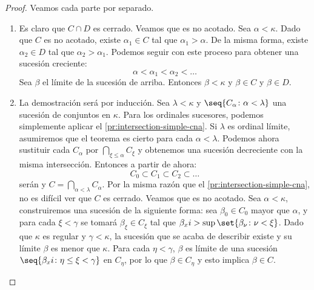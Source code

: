 \begin{proof}
    Veamos cada parte por separado.

    \begin{enumerate}[label=\alph*)]
        \item\label{pr:intersection-simple-cna}
            Es claro que $C\cap D$ es cerrado. Veamos que es no acotado.
            Sea $\alpha<\kappa$. Dado que $C$ es no acotado, existe $\alpha_1\in C$
            tal que $\alpha_1 > \alpha$. De la misma forma, existe $\alpha_2\in D$
            tal que $\alpha_2 > \alpha_1$. Podemos seguir con este proceso para obtener
            una sucesión creciente:
            \[
                \alpha < \alpha_1 < \alpha_2 < \dots
            \]
            Sea $\beta$ el límite de la sucesión de arriba.
            Entonces $\beta < \kappa$ y $\beta\in C$ y $\beta\in D$.


        \item\label{pr:intersection-cna}
            La demostración será por inducción.
            Sea $\lambda<\kappa$ y $\seq{C_\alpha\colon\alpha<\lambda}$
            una sucesión de conjuntos \cna{} en $\kappa$.
            Para los ordinales sucesores, podemos simplemente aplicar
            el \cref{pr:intersection-simple-cna}.
            Si $\lambda$ es ordinal límite, asumiremos que el teorema
            es cierto para cada $\alpha<\lambda$. Podemos ahora sustituir
            cada $C_\alpha$ por $\bigcap_{\xi\leq\alpha} C_\xi$ y obtenemos
            una sucesión decreciente con la misma intersección. Entonces a partir de ahora:
            \[
                C_0 \subset C_1 \subset C_2 \subset \dots
            \]
            serán \cna{} y $C = \bigcap_{\alpha<\lambda} C_\alpha$.
            Por la misma razón que el \cref{pr:intersection-simple-cna}, no es difícil
            ver que $C$ es cerrado. Veamos que es no acotado. Sea $\alpha<\kappa$,
            construiremos una sucesión de la siguiente forma: sea $\beta_0\in C_0$ mayor que
            $\alpha$, y para cada $\xi<\gamma$ se tomará $\beta_\xi\in C_\xi$
            tal que $\beta_xi > \sup\set{\beta_\nu\colon\nu<\xi}$.
            Dado que $\kappa$ es regular y $\gamma<\kappa$, la sucesión que se acaba de
            describir existe y su límite $\beta$ es menor que $\kappa$.
            Para cada $\eta<\gamma$, $\beta$ es límite de una sucesión
            $\seq{\beta_xi\colon\eta\leq\xi<\gamma}$ en $C_\eta$, por lo que
            $\beta\in C_\eta$ y esto implica $\beta\in C$.



\end{enumerate}
\end{proof}
